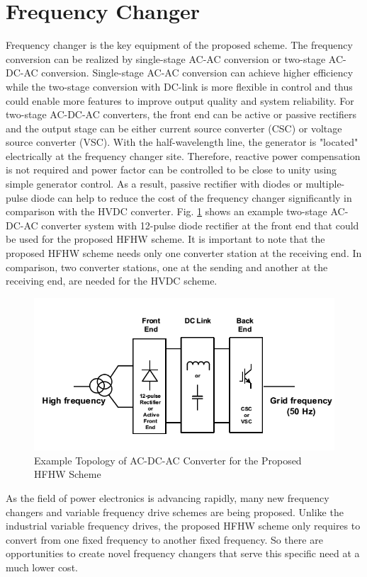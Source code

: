 \documentclass[12pt,a4paper]{reportmod}
\begin{document}
\section{Frequency Changer}
\par Frequency changer is the key equipment of the proposed scheme. The frequency conversion can be realized by single-stage AC-AC conversion or two-stage AC-DC-AC conversion. Single-stage AC-AC conversion can achieve higher efficiency while the two-stage conversion with DC-link is more flexible in control and thus could enable more features to improve output quality and system reliability. For two-stage AC-DC-AC converters, the front end can be active or passive rectifiers and the output stage can be either current source converter (CSC) or voltage source converter (VSC). With the half-wavelength line, the generator is "located" electrically at the frequency changer site. Therefore, reactive power compensation is not required and power factor can be controlled to be close to unity using simple generator control. As a result, passive rectifier with diodes or multiple-pulse diode can help to reduce the cost of the frequency changer significantly in comparison with the HVDC converter. Fig. \ref{fig:cyclo} shows an example two-stage AC-DC-AC converter system with 12-pulse diode rectifier at the front end that could be used for the proposed HFHW scheme. It is important to note that the proposed HFHW scheme needs only one converter station at the receiving end. In comparison, two converter stations, one at the sending and another at the receiving end, are needed for the HVDC scheme.
\begin{figure}[h]
\label{fig:cyclo}
\begin{center}
\includegraphics[scale=0.5]{cyclo.png}
\caption{Example Topology of AC-DC-AC Converter for the Proposed HFHW Scheme}
\end{center}
\end{figure}
\par As the field of power electronics is advancing rapidly, many new frequency changers and variable frequency drive schemes are being proposed. Unlike the industrial variable frequency drives, the proposed HFHW scheme only requires to convert from one fixed frequency to another fixed frequency. So there are opportunities to create novel frequency changers that serve this specific need at a much lower cost.
\end{document}
